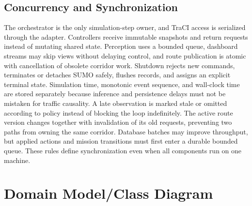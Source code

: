 \subsection{Concurrency and Synchronization}

The orchestrator is the only simulation-step owner, and TraCI access is serialized through the adapter. Controllers receive immutable snapshots and return requests instead of mutating shared state. Perception uses a bounded queue, dashboard streams may skip views without delaying control, and route publication is atomic with cancellation of obsolete corridor work. Shutdown rejects new commands, terminates or detaches SUMO safely, flushes records, and assigns an explicit terminal state. Simulation time, monotonic event sequence, and wall-clock time are stored separately because inference and persistence delays must not be mistaken for traffic causality. A late observation is marked stale or omitted according to policy instead of blocking the loop indefinitely. The active route version changes together with invalidation of its old requests, preventing two paths from owning the same corridor. Database batches may improve throughput, but applied actions and mission transitions must first enter a durable bounded queue. These rules define synchronization even when all components run on one machine.

\section{Domain Model/Class Diagram}
\label{sec:domain-model}

